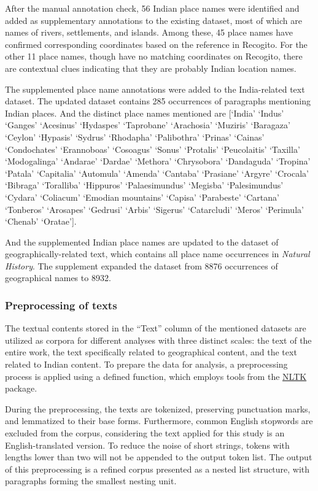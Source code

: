 \documentclass[
  12pt,
]{article}
\begin{document}
After the manual annotation check, 56 Indian place names were identified
and added as supplementary annotations to the existing dataset, most of
which are names of rivers, settlements, and islands. Among these, 45
place names have confirmed corresponding coordinates based on the
reference in Recogito. For the other 11 place names, though have no
matching coordinates on Recogito, there are contextual clues indicating
that they are probably Indian location names.

The supplemented place name annotations were added to the India-related
text dataset. The updated dataset contains 285 occurrences of paragraphs
mentioning Indian places. And the distinct place names mentioned are
{[}`India' `Indus' `Ganges' `Acesinus' `Hydaspes' `Taprobane'
`Arachosia' `Muziris' `Baragaza' `Ceylon' `Hypasis' `Sydrus' `Rhodapha'
`Palibothra' `Prinas' `Cainas' `Condochates' `Erannoboas' `Cosoagus'
`Sonus' `Protalis' `Peucolaitis' `Taxilla' `Modogalinga' `Andarae'
`Dardae' `Methora' `Chrysobora' `Dandaguda' `Tropina' `Patala'
`Capitalia' `Automula' `Amenda' `Cantaba' `Prasiane' `Argyre' `Crocala'
`Bibraga' `Toralliba' `Hippuros' `Palaesimundus' `Megisba'
`Palesimundus' `Cydara' `Coliacum' `Emodian mountains' `Capisa'
`Parabeste' `Cartana' `Tonberos' `Arosapes' `Gedrusi' `Arbis' `Sigerus'
`Catarcludi' `Meros' `Perimula' `Chenab' `Oratae'{]}.

And the supplemented Indian place names are updated to the dataset of
geographically-related text, which contains all place name occurrences
in \emph{Natural History}. The supplement expanded the dataset from 8876
occurrences of geographical names to 8932.

\hypertarget{preprocessing-of-texts}{%
\subsubsection{Preprocessing of texts}\label{preprocessing-of-texts}}

The textual contents stored in the ``Text'' column of the mentioned
datasets are utilized as corpora for different analyses with three
distinct scales: the text of the entire work, the text specifically
related to geographical content, and the text related to Indian content.
To prepare the data for analysis, a preprocessing process is applied
using a defined function, which employs tools from the
\href{https://www.nltk.org/}{NLTK} package.

During the preprocessing, the texts are tokenized, preserving
punctuation marks, and lemmatized to their base forms. Furthermore,
common English stopwords are excluded from the corpus, considering the
text applied for this study is an English-translated version. To reduce
the noise of short strings, tokens with lengths lower than two will not
be appended to the output token list. The output of this preprocessing
is a refined corpus presented as a nested list structure, with
paragraphs forming the smallest nesting unit.
\end{document}

